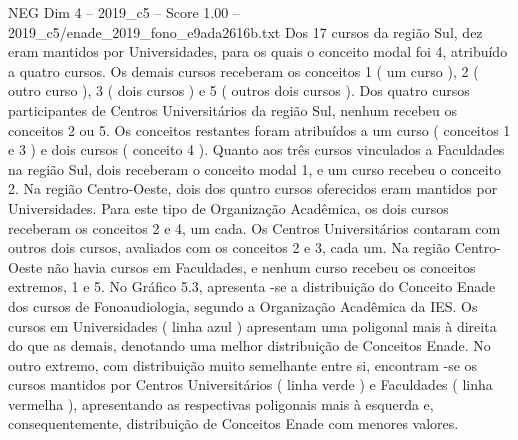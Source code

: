 \begin{textsample}{NEG Dim 4 – 2019\_c5 – Score 1.00 – 2019\_c5/enade\_2019\_fono\_e9ada2616b.txt}
Dos 17 cursos da região Sul, dez eram mantidos por Universidades, para os quais o conceito modal foi 4, atribuído a quatro cursos.
Os demais cursos receberam os conceitos 1 ( um curso ), 2 ( outro curso ), 3 ( dois cursos ) e 5 ( outros dois cursos ).
Dos quatro cursos participantes de Centros Universitários da região Sul, nenhum recebeu os conceitos 2 ou 5.
Os conceitos restantes foram atribuídos a um curso ( conceitos 1 e 3 ) e dois cursos ( conceito 4 ).
Quanto aos três cursos vinculados a Faculdades na região Sul, dois receberam o conceito modal 1, e um curso recebeu o conceito 2.
Na região Centro-Oeste, dois dos quatro cursos oferecidos eram mantidos por Universidades.
Para este tipo de Organização Acadêmica, os dois cursos receberam os conceitos 2 e 4, um cada.
Os Centros Universitários contaram com outros dois cursos, avaliados com os conceitos 2 e 3, cada um.
Na região Centro-Oeste não havia cursos em Faculdades, e nenhum curso recebeu os conceitos extremos, 1 e 5.
No Gráfico 5.3, apresenta -se a distribuição do Conceito Enade dos cursos de Fonoaudiologia, segundo a Organização Acadêmica da IES.
Os cursos em Universidades ( linha azul ) apresentam uma poligonal mais à direita do que as demais, denotando uma melhor distribuição de Conceitos Enade.
No outro extremo, com distribuição muito semelhante entre si, encontram -se os cursos mantidos por Centros Universitários ( linha verde ) e Faculdades ( linha vermelha ), apresentando as respectivas poligonais mais à esquerda e, consequentemente, distribuição de Conceitos Enade com menores valores.

\end{textsample}

